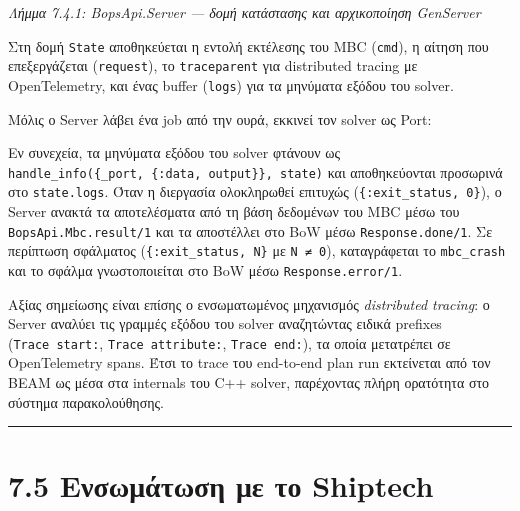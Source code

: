 \emph{Λήμμα 7.4.1: BopsApi.Server --- δομή κατάστασης και αρχικοποίηση
GenServer}

Στη δομή \texttt{State} αποθηκεύεται η εντολή εκτέλεσης του MBC
(\texttt{cmd}), η αίτηση που επεξεργάζεται (\texttt{request}), το
\texttt{traceparent} για distributed tracing με OpenTelemetry, και ένας
buffer (\texttt{logs}) για τα μηνύματα εξόδου του solver.

Μόλις ο Server λάβει ένα job από την ουρά, εκκινεί τον solver ως Port:

\begin{Shaded}
\begin{Highlighting}[]
\OperatorTok{=} \FunctionTok{(\{}\FunctionTok{\}}\NormalTok{, }\OtherTok{[}
  \NormalTok{,}
  \NormalTok{,}
   \OtherTok{[}\OtherTok{]}
\OtherTok{]}\FunctionTok{)}
\end{Highlighting}
\end{Shaded}

Εν συνεχεία, τα μηνύματα εξόδου του solver φτάνουν ως
\texttt{handle\_info(\{\_port,\ \{:data,\ output\}\},\ state)} και
αποθηκεύονται προσωρινά στο \texttt{state.logs}. Όταν η διεργασία
ολοκληρωθεί επιτυχώς (\texttt{\{:exit\_status,\ 0\}}), ο Server ανακτά
τα αποτελέσματα από τη βάση δεδομένων του MBC μέσω του
\texttt{BopsApi.Mbc.result/1} και τα αποστέλλει στο BoW μέσω
\texttt{Response.done/1}. Σε περίπτωση σφάλματος
(\texttt{\{:exit\_status,\ N\}} με \texttt{N\ ≠\ 0}), καταγράφεται το
\texttt{mbc\_crash} και το σφάλμα γνωστοποιείται στο BoW μέσω
\texttt{Response.error/1}.

Αξίας σημείωσης είναι επίσης ο ενσωματωμένος μηχανισμός
\emph{distributed tracing}: ο Server αναλύει τις γραμμές εξόδου του
solver αναζητώντας ειδικά prefixes (\texttt{Trace\ start:},
\texttt{Trace\ attribute:}, \texttt{Trace\ end:}), τα οποία μετατρέπει
σε OpenTelemetry spans. Έτσι το trace του end-to-end plan run εκτείνεται
από τον BEAM ως μέσα στα internals του C++ solver, παρέχοντας πλήρη
ορατότητα στο σύστημα παρακολούθησης.

\begin{center}\rule{0.5\linewidth}{0.5pt}\end{center}

\section{7.5 Ενσωμάτωση με το
Shiptech}\label{ux3b5ux3bdux3c3ux3c9ux3bcux3acux3c4ux3c9ux3c3ux3b7-ux3bcux3b5-ux3c4ux3bf-shiptech}

